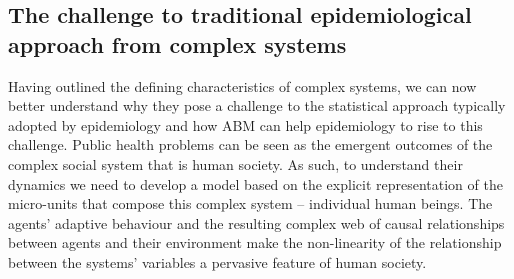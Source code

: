 \documentclass[review]{elsarticle}
\begin{document}
\subsection{The challenge to traditional epidemiological approach from complex systems}
Having outlined the defining characteristics of complex systems, we can now better understand why they pose a challenge to the statistical approach typically adopted by epidemiology and how ABM can help epidemiology to rise to this challenge. Public health problems can be seen as the emergent outcomes of the complex social system that is human society. As such, to understand their dynamics we need to develop a model based on the explicit representation of the micro-units that compose this complex system -- individual human beings.  The agents' adaptive behaviour and the resulting complex web of causal relationships between agents and their environment make the non-linearity of the relationship between the systems' variables a pervasive feature of human society. 
\end{document}
